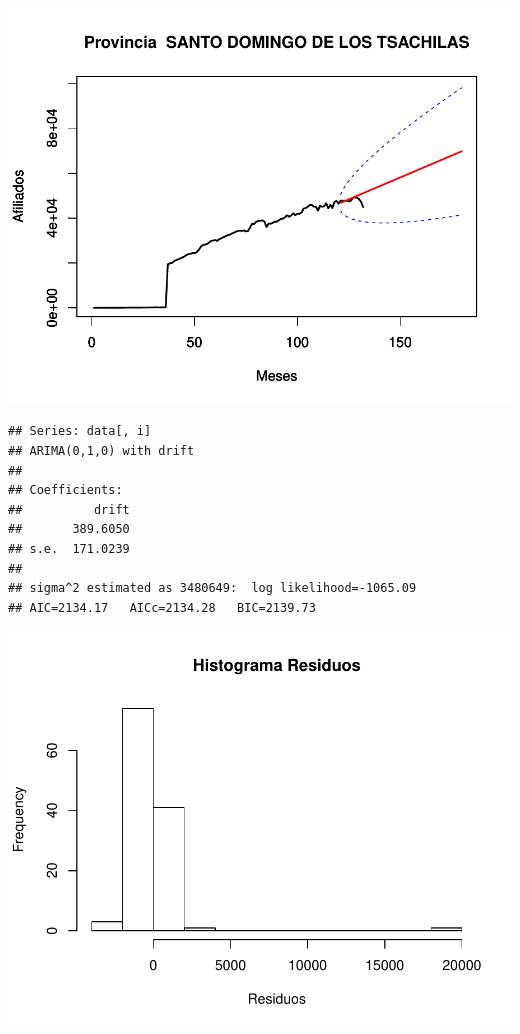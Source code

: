\documentclass[11pt,a4paper,oneside]{article}\usepackage[]{graphicx}\usepackage[]{color}
\makeatletter
\def\maxwidth{ %
  \ifdim\Gin@nat@width>\linewidth
    \linewidth
  \else
    \Gin@nat@width
  \fi
}
\newenvironment{kframe}{%
 \def\at@end@of@kframe{}%
 \ifinner\ifhmode%
  \def\at@end@of@kframe{\end{minipage}}%
  \begin{minipage}{\columnwidth}%
 \fi\fi%
 \def\FrameCommand##1{\hskip\@totalleftmargin \hskip-\fboxsep
 \colorbox{shadecolor}{##1}\hskip-\fboxsep
     \hskip-\linewidth \hskip-\@totalleftmargin \hskip\columnwidth}%
 \MakeFramed {\advance\hsize-\width
   \@totalleftmargin\z@ \linewidth\hsize
   \@setminipage}}%
 {\par\unskip\endMakeFramed%
 \at@end@of@kframe}
\newenvironment{knitrout}{}{} %
\makeatother
\begin{document}
\begin{knitrout}
{\centering \includegraphics[width=\maxwidth]{figure/unnamed-chunk-16-61} 

}


\begin{kframe}\begin{verbatim}
## Series: data[, i] 
## ARIMA(0,1,0) with drift         
## 
## Coefficients:
##          drift
##       389.6050
## s.e.  171.0239
## 
## sigma^2 estimated as 3480649:  log likelihood=-1065.09
## AIC=2134.17   AICc=2134.28   BIC=2139.73
\end{verbatim}
\end{kframe}

{\centering \includegraphics[width=\maxwidth]{figure/unnamed-chunk-16-62} 

}
\end{knitrout}
\end{document}
